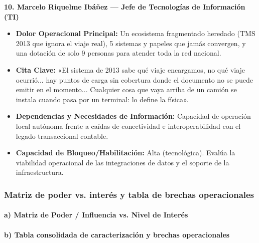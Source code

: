 \textbf{10. Marcelo Riquelme Ibáñez --- Jefe de Tecnologías de Información (TI)}
\begin{itemize}
    \item \textbf{Dolor Operacional Principal:} Un ecosistema fragmentado heredado (TMS 2013 que ignora el viaje real), 5 sistemas y papeles que jamás convergen, y una dotación de solo 9 personas para atender toda la red nacional.
    \item \textbf{Cita Clave:} «El sistema de 2013 sabe qué viaje encargamos, no qué viaje ocurrió... hay puntos de carga sin cobertura donde el documento no se puede emitir en el momento... Cualquier cosa que vaya arriba de un camión se instala cuando pasa por un terminal: lo define la física».
    \item \textbf{Dependencias y Necesidades de Información:} Capacidad de operación local autónoma frente a caídas de conectividad e interoperabilidad con el legado transaccional contable.
    \item \textbf{Capacidad de Bloqueo/Habilitación:} Alta (tecnológica). Evalúa la viabilidad operacional de las integraciones de datos y el soporte de la infraestructura.
\end{itemize}

\subsubsection{Matriz de poder vs. interés y tabla de brechas operacionales}

\paragraph{a) Matriz de Poder / Influencia vs. Nivel de Interés}

\vspace{-6pt}

\vspace{12pt}
\paragraph{b) Tabla consolidada de caracterización y brechas operacionales}

